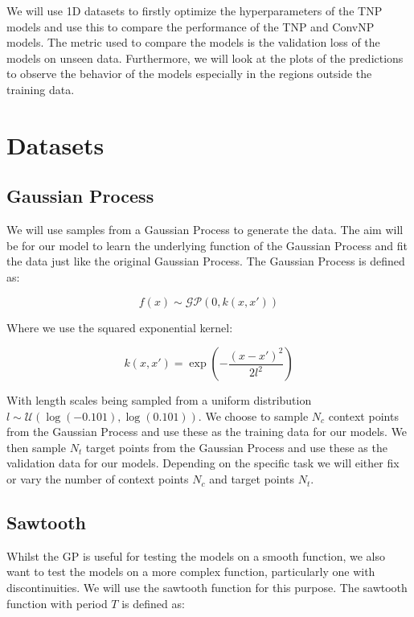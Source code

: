 \documentclass[../../main.tex]{subfiles}
\begin{document}
We will use 1D datasets to firstly optimize the hyperparameters of the TNP models and use this to compare the performance of the TNP and ConvNP models. The metric used to compare the models is the validation loss of the models on unseen data. Furthermore, we will look at the plots of the predictions to observe the behavior of the models especially in the regions outside the training data.


\section{Datasets}

\subsection{Gaussian Process}
\label{sec:1d-gp-dataset}

We will use samples from a Gaussian Process to generate the data. The aim will be for our model to learn the underlying function of the Gaussian Process and fit the data just like the original Gaussian Process. The Gaussian Process is defined as:

\begin{equation}
	f(x) \sim \mathcal{GP}(0, k(x, x'))
\end{equation}

Where we use the squared exponential kernel:

\begin{equation}
	k(x, x') = \exp\left(-\frac{(x - x')^2}{2l^2}\right)
\end{equation}

With length scales being sampled from a uniform distribution $l \sim \mathcal{U}(\log(-0.101), \log(0.101))$. We choose to sample $N_c$ context points from the Gaussian Process and use these as the training data for our models. We then sample $N_t$ target points from the Gaussian Process and use these as the validation data for our models. Depending on the specific task we will either fix or vary the number of context points $N_c$ and target points $N_t$.


\subsection{Sawtooth}
\label{sec:1d-sawtooth-dataset}

Whilst the GP is useful for testing the models on a smooth function, we also want to test the models on a more complex function, particularly one with discontinuities. We will use the sawtooth function for this purpose. The sawtooth function with period $T$ is defined as:
\end{document}
